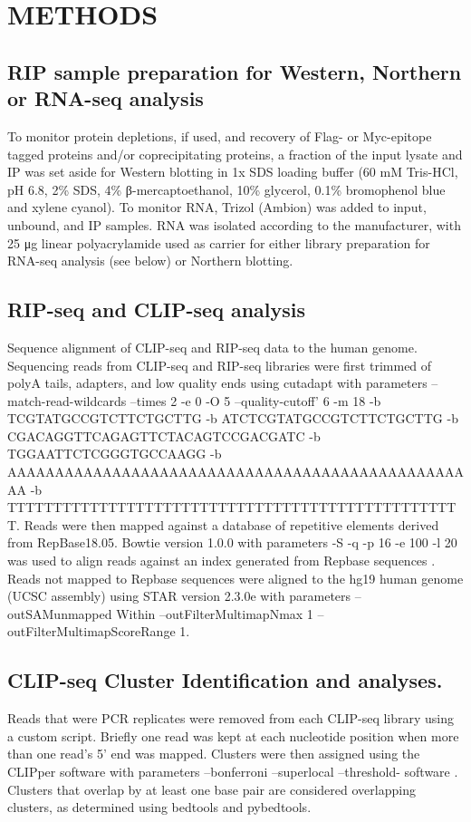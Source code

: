 \section{METHODS}

\subsection{RIP sample preparation for Western, Northern or RNA-seq analysis}
To monitor protein depletions, if used, and recovery of Flag- or Myc-epitope tagged proteins and/or coprecipitating proteins, a fraction of the input lysate and IP was set aside for Western blotting in 1x SDS loading buffer (60 mM Tris-HCl, pH 6.8, 2\% SDS, 4\% β-mercaptoethanol, 10\% glycerol, 0.1\% bromophenol blue and xylene cyanol). To monitor RNA, Trizol (Ambion) was added to input, unbound, and IP samples. RNA was isolated according to the manufacturer, with 25 μg linear polyacrylamide used as carrier for either library preparation for RNA-seq analysis (see below) or Northern blotting. 

\subsection{RIP-seq and CLIP-seq analysis}
Sequence alignment of CLIP-seq and RIP-seq data to the human genome.
Sequencing reads from CLIP-seq and RIP-seq libraries were first trimmed of polyA tails, adapters, and low quality ends using cutadapt with parameters --match-read-wildcards --times 2 -e 0 -O 5 --quality-cutoff' 6 -m 18 -b TCGTATGCCGTCTTCTGCTTG -b ATCTCGTATGCCGTCTTCTGCTTG -b CGACAGGTTCAGAGTTCTACAGTCCGACGATC -b TGGAATTCTCGGGTGCCAAGG -b AAAAAAAAAAAAAAAAAAAAAAAAAAAAAAAAAAAAAAAAAAAAAAAAAA -b TTTTTTTTTTTTTTTTTTTTTTTTTTTTTTTTTTTTTTTTTTTTTTTTTT. Reads were then mapped against a database of repetitive elements derived from RepBase18.05. Bowtie version 1.0.0 with parameters -S -q -p 16 -e 100 -l 20 was used to align reads against an index generated from Repbase sequences \cite{Langmead2009}. Reads not mapped to Repbase sequences were aligned to the hg19 human genome (UCSC assembly) using STAR \cite{Dobin2013a} version 2.3.0e with parameters --outSAMunmapped Within –outFilterMultimapNmax 1 –outFilterMultimapScoreRange 1.


\subsection{CLIP-seq Cluster Identification and analyses.}
Reads that were PCR replicates were removed from each CLIP-seq library using a custom script. Briefly one read was kept at each nucleotide position when more than one read’s 5' end was mapped. Clusters were then assigned using the CLIPper software with parameters --bonferroni --superlocal --threshold- software \cite{Lovci2013}. Clusters that overlap by at least one base pair are considered overlapping clusters, as determined using bedtools \cite{Quinlan2010} and pybedtools\cite{Dale2011a}.

